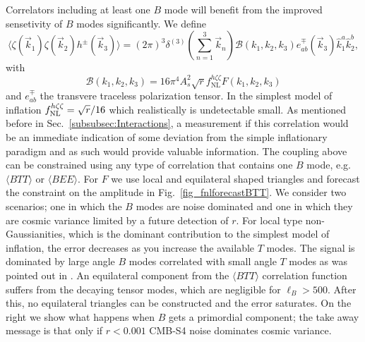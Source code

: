 Correlators including at least one $B$ mode will benefit from the improved sensetivity of $B$ modes significantly. We define \cite{Meerburg2016}
\begin{equation}
\langle \zeta(\vec{k}_1)\zeta(\vec{k}_2)h^{\pm}(\vec{k}_3) \rangle = (2\pi)^3  \delta^{(3)} \left(\sum_{n=1}^3\vec{k}_n\right) \mathcal{B}(k_1,k_2,k_3) e_{ab}^{\mp}(\vec{k}_3)\hat{k}_1^a \hat{k}_2^b, 
\end{equation}
with 
\begin{equation}
\mathcal{B}(k_1,k_2,k_3)= 16 \pi^4 A_s^2 \sqrt{r}f_\mathrm{NL}^{h\zeta\zeta} F(k_1,k_2,k_3)
\end{equation}
and $e_{ab}^{\mp}$ the transvere traceless polarization tensor. 
In the simplest model of inflation $f^{h \zeta \zeta}_{\rm NL} = \sqrt{r}/16$ \cite{Maldacena:2002vr,Maldacena:2011nz} which realistically is undetectable small. As mentioned before in Sec.~\ref{subsubsec:Interactions}, a measurement if this correlation would be an immediate indication of some deviation from the simple inflationary paradigm and as such would provide valuable information. The coupling above can be constrained using any type of correlation that contains one $B$ mode, e.g. $\langle BTT \rangle$ or $\langle BEE\rangle$. For $F$ we use local and equilateral shaped triangles and forecast the constraint on the amplitude in Fig.~\ref{fig_fnlforecastBTT}. We consider two scenarios; one in which the $B$ modes are noise dominated and one in which they are cosmic variance limited by a future detection of $r$. For local type non-Gaussianities, which is the dominant contribution to the simplest model of inflation, the error decreases as you increase the available $T$ modes. The signal is dominated by large angle $B$ modes correlated with small angle $T$ modes as was pointed out in \cite{Meerburg2016}. An equilateral component from the $\langle BTT\rangle$ correlation function suffers from the decaying tensor modes, which are negligible for $\ell_B > 500$. After this, no equilateral triangles can be constructed and the error saturates. On the right we show what happens when $B$ gets a primordial component; the take away message is that only if $r < 0.001$  CMB-S4 noise dominates cosmic variance. 

